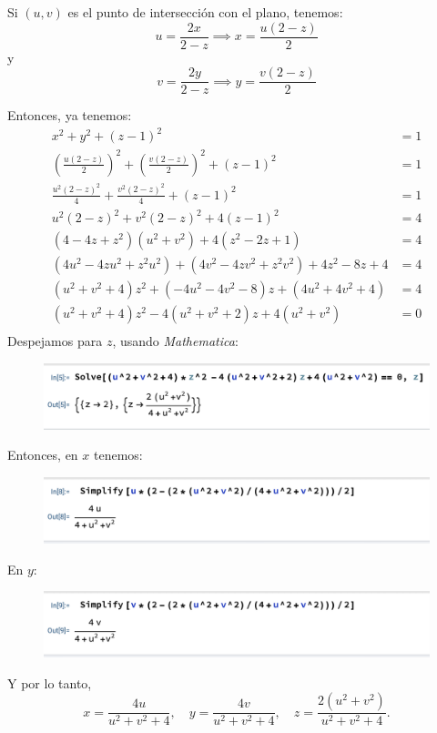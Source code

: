 \begin{problema}
\begin{enumerate}
\begin{sol}
    Si $(u,v)$ es el punto de intersección con el plano, tenemos: 
    $$ u=\frac{2x}{2-z} \implies x=\frac{u(2-z)}{2}$$ y $$ v=\frac{2y}{2-z}\implies y=\frac{v(2-z)}{2} $$

    Entonces, ya tenemos: 
    \begin{align*}
        x^2+y^2+(z-1)^2&=1\\
        \left(\frac{u(2-z)}{2}\right)^2+\left(\frac{v(2-z)}{2}\right)^2+(z-1)^2 &= 1\\
        \frac{u^2(2-z)^2}{4}+\frac{v^2(2-z)^2}{4}+(z-1)^2 &= 1\\
        u^2(2-z)^2+v^2(2-z)^2+4(z-1)^2 &= 4\\
        (4-4z+z^2)(u^2+v^2)+4(z^2-2z+1) &= 4\\
        (4u^2-4zu^2+z^2u^2)+(4v^2-4zv^2+z^2v^2) + 4z^2-8z+4 &= 4 \\
        (u^2+v^2+4)z^2+(-4u^2-4v^2-8)z+(4u^2+4v^2+4) &= 4\\
        (u^2+v^2+4)z^2-4(u^2+v^2+2)z+4(u^2+v^2) &= 0\\
    \end{align*}
    Despejamos para $z$, usando \textit{Mathematica}:
    \begin{figure}[H]
        \centering 
        \includegraphics[scale=0.4]{imagenes/5.png}
    \end{figure}
        Entonces, en $x$ tenemos: 
        \begin{figure}[H]
            \centering 
            \includegraphics[scale=0.4]{imagenes/6.png}
        \end{figure}
        En $y$: 
        \begin{figure}[H]
            \centering 
            \includegraphics[scale=0.4]{imagenes/7.png}
        \end{figure}
        Y por lo tanto, 
        $$
x=\frac{4 u}{u^2+v^2+4}, \quad y=\frac{4 v}{u^2+v^2+4}, \quad z=\frac{2\left(u^2+v^2\right)}{u^2+v^2+4} .
$$


\end{sol}
\end{enumerate}
\end{problema}
